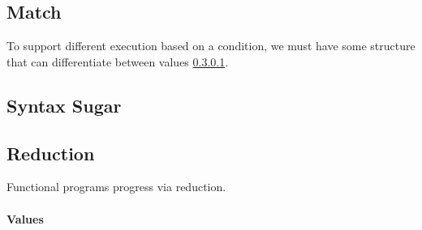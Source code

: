 \subsection{Match}
To support different execution based on a condition, we must have some structure that can differentiate between values \ref{design:values}. 

\subsection{Syntax Sugar}

\subsection{Reduction}
Functional programs progress via reduction. 
\paragraph{Values}
\label{design:values}